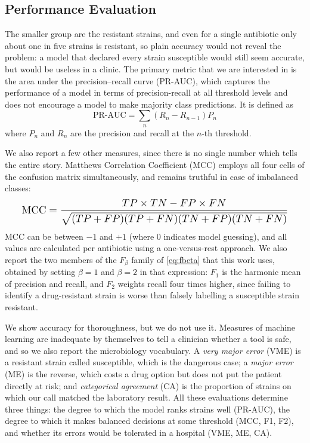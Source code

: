 \documentclass[journal]{IEEEtran}
\begin{document}
\subsection{Performance Evaluation}
\label{sec:perfeval}

The smaller group are the resistant strains, and even for a single antibiotic only
about one in five strains is resistant, so plain accuracy would not reveal the
problem: a model that declared every strain susceptible would still seem accurate,
but would be useless in a clinic. The primary metric that we are interested in is
the area under the precision--recall curve (PR-AUC), which captures the performance
of a model in terms of precision-recall at all threshold levels and does not
encourage a model to make majority class predictions. It is defined as
\begin{equation}
\text{PR-AUC} = \sum_{n} \left( R_n - R_{n-1} \right) P_n
\end{equation}
where $P_n$ and $R_n$ are the precision and recall at the $n$-th threshold.

We also report a few other measures, since there is no single number which tells the
entire story. Matthews Correlation Coefficient (MCC) employs all four cells of the
confusion matrix simultaneously, and remains truthful in case of imbalanced classes:
\begin{equation}
\resizebox{0.93\columnwidth}{!}{$\displaystyle
\text{MCC} = \frac{TP \times TN - FP \times FN}
{\sqrt{(TP+FP)(TP+FN)(TN+FP)(TN+FN)}}$}
\end{equation}
MCC can be between $-1$ and $+1$ (where $0$ indicates model guessing), and all
values are calculated per antibiotic using a one-versus-rest approach. We also report
the two members of the $F_\beta$ family of \eqref{eq:fbeta} that this work uses,
obtained by setting $\beta = 1$ and $\beta = 2$ in that expression: $F_1$ is the
harmonic mean of precision and recall, and $F_2$ weights recall four times higher,
since failing to identify a drug-resistant strain is worse than falsely labelling a
susceptible strain resistant.

We show accuracy for thoroughness, but we do not use it. Measures of machine
learning are inadequate by themselves to tell a clinician whether a tool is safe, and
so we also report the microbiology vocabulary. A \emph{very major error} (VME) is a
resistant strain called susceptible, which is the dangerous case; a \emph{major
error} (ME) is the reverse, which costs a drug option but does not put the patient
directly at risk; and \emph{categorical agreement} (CA) is the proportion of strains
on which our call matched the laboratory result. All these evaluations determine
three things: the degree to which the model ranks strains well (PR-AUC), the degree
to which it makes balanced decisions at some threshold (MCC, F1, F2), and whether its
errors would be tolerated in a hospital (VME, ME, CA).
\end{document}
